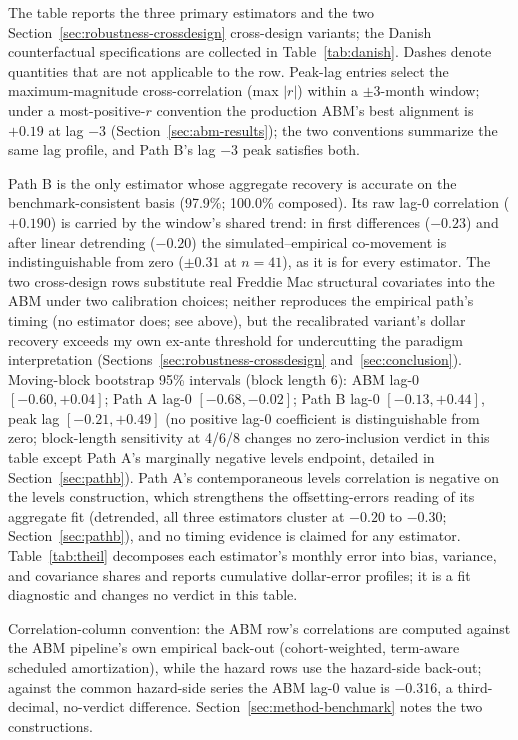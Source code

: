 \documentclass[12pt]{article}
\begin{document}
\begin{table}[H]
\begin{threeparttable}
\begin{tabular}{@{}>{\raggedright\arraybackslash}p{3.2cm}>{\raggedleft\arraybackslash}p{2.4cm}>{\raggedleft\arraybackslash}p{2.4cm}>{\raggedright\arraybackslash}p{2.3cm}>{\raggedright\arraybackslash}p{4.0cm}@{}}
\bottomrule
\end{tabular}
\begin{tablenotes}[flushleft]\scriptsize
\item The table reports the three primary estimators and the two Section~\ref{sec:robustness-crossdesign} cross-design variants; the Danish counterfactual specifications are collected in Table~\ref{tab:danish}. Dashes denote quantities that are not applicable to the row. Peak-lag entries select the maximum-magnitude cross-correlation (max $|r|$) within a $\pm$3-month window; under a most-positive-$r$ convention the production ABM's best alignment is $+0.19$ at lag $-3$ (Section~\ref{sec:abm-results}); the two conventions summarize the same lag profile, and Path B's lag $-3$ peak satisfies both.
\item Path B is the only estimator whose aggregate recovery is accurate on the benchmark-consistent basis (97.9\%; 100.0\% composed). Its raw lag-0 correlation ($+0.190$) is carried by the window's shared trend: in first differences ($-0.23$) and after linear detrending ($-0.20$) the simulated--empirical co-movement is indistinguishable from zero ($\pm 0.31$ at $n = 41$), as it is for every estimator. The two cross-design rows substitute real Freddie Mac structural covariates into the ABM under two calibration choices; neither reproduces the empirical path's timing (no estimator does; see above), but the recalibrated variant's dollar recovery exceeds my own ex-ante threshold for undercutting the paradigm interpretation (Sections~\ref{sec:robustness-crossdesign} and~\ref{sec:conclusion}). Moving-block bootstrap 95\% intervals (block length 6): ABM lag-0 $[-0.60, +0.04]$; Path A lag-0 $[-0.68, -0.02]$; Path B lag-0 $[-0.13, +0.44]$, peak lag $[-0.21, +0.49]$ (no positive lag-0 coefficient is distinguishable from zero; block-length sensitivity at 4/6/8 changes no zero-inclusion verdict in this table except Path A's marginally negative levels endpoint, detailed in Section~\ref{sec:pathb}). Path A's contemporaneous levels correlation is negative on the levels construction, which strengthens the offsetting-errors reading of its aggregate fit (detrended, all three estimators cluster at $-0.20$ to $-0.30$; Section~\ref{sec:pathb}), and no timing evidence is claimed for any estimator. Table~\ref{tab:theil} decomposes each estimator's monthly error into bias, variance, and covariance shares and reports cumulative dollar-error profiles; it is a fit diagnostic and changes no verdict in this table.
\item Correlation-column convention: the ABM row's correlations are computed against the ABM pipeline's own empirical back-out (cohort-weighted, term-aware scheduled amortization), while the hazard rows use the hazard-side back-out; against the common hazard-side series the ABM lag-0 value is $-0.316$, a third-decimal, no-verdict difference. Section~\ref{sec:method-benchmark} notes the two constructions.

\end{tablenotes}
\end{threeparttable}
\end{table}
\end{document}
